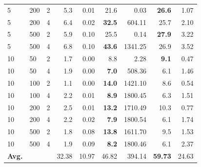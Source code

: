 \documentclass[runningheads]{llncs}
\begin{document}
\begin{table}[!ht]
{\begin{tabular}{lll|rr|rr|rr}
 			5 &      200 &         2 &             5.3 &         0.01 &                     21.6 &                  0.03 &         \textbf{26.6} &      1.07 \\
 			5 &      200 &         4 &             6.4 &         0.02 &                     \textbf{32.5} &                604.11 &         {25.7} &      2.10 \\
 			5 &      500 &         2 &             5.9 &         0.10 &                     25.5 &                  0.14 &         \textbf{27.9} &      3.22 \\
 			5 &      500 &         4 &             6.8 &         0.10 &                     \textbf{43.6} &               1341.25 &         26.9 &      3.52 \\ \hline
 			10 &       50 &         2 &             1.7 &         0.00 &                      8.8 &                  2.28 &          \textbf{9.1} &      0.47 \\ 
 			10 &       50 &         4 &             1.9 &         0.00 &                      \textbf{7.0} &                508.36 &          6.1 &      1.46 \\
 			10 &      100 &         2 &             1.1 &         0.00 &                     \textbf{14.0} &               1421.10 &          8.6 &      0.54 \\
 			10 &      100 &         4 &             2.2 &         0.01 &                      \textbf{8.9} &               1800.45 &          {6.3} &      1.51 \\
 			10 &      200 &         2 &             2.5 &         0.01 &                     \textbf{13.2} &               1710.49 &         10.3 &      0.77 \\
 			10 &      200 &         4 &             2.2 &         0.02 &                      \textbf{7.9} &               1800.54 &          6.1 &      1.74 \\
 			10 &      500 &         2 &             1.8 &         0.08 &                     \textbf{13.8} &               1611.70 &          {9.5} &      1.53 \\
 			10 &      500 &         4 &             1.9 &         0.09 &                      \textbf{8.2} &               1800.46 &          6.1 &      2.37 \\
 			\hline \hline
 			\textbf{Avg.} &  &  &  32.38 & 10.97 & 46.82 & 394.14 &  \textbf{59.73} & 24.63  \\ \hline \hline
 	\end{tabular}}
 \end{table}
 
\end{document}
